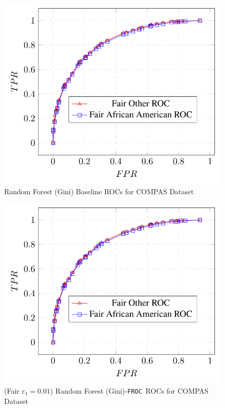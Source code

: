 \documentclass{article}
\newcommand{\ouralgo}{\texttt{FROC}}
\begin{document}
\begin{figure}[!h]
    \centering
    \includegraphics[width=1\linewidth]{Images/RFG_COMPAS_Baseline_ROC_FROC.png}
    \caption{Random Forest (Gini) Baseline ROCs for COMPAS Dataset}
    \label{fig:RFG_COMPAS_Baseline_ROC_FROC}
\end{figure}

\begin{figure}[!h]
    \centering
    \includegraphics[width=1\linewidth]{Images/RFG_COMPAS_Baseline_ROC_FROC.png}
    \caption{(Fair $\varepsilon_1 = 0.01$) Random Forest (Gini)-\ouralgo\   ROCs for COMPAS Dataset}
    \label{fig:RFG_COMPAS_Baseline_ROC_FROC}
\end{figure}
\end{document}
